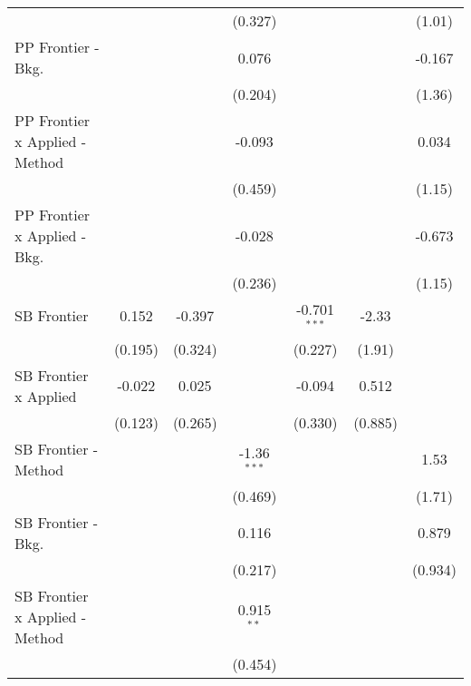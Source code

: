 \begin{tabular}{lcccccc}
                                  &               &         & (0.327)       &                &             & (1.01)\\   
   PP Frontier - Bkg.             &               &         & 0.076         &                &             & -0.167\\   
                                  &               &         & (0.204)       &                &             & (1.36)\\   
   PP Frontier x Applied - Method &               &         & -0.093        &                &             & 0.034\\   
                                  &               &         & (0.459)       &                &             & (1.15)\\   
   PP Frontier x Applied - Bkg.   &               &         & -0.028        &                &             & -0.673\\   
                                  &               &         & (0.236)       &                &             & (1.15)\\   
   SB Frontier                    & 0.152         & -0.397  &               & -0.701$^{***}$ & -2.33       &   \\   
                                  & (0.195)       & (0.324) &               & (0.227)        & (1.91)      &   \\   
   SB Frontier x Applied          & -0.022        & 0.025   &               & -0.094         & 0.512       &   \\   
                                  & (0.123)       & (0.265) &               & (0.330)        & (0.885)     &   \\   
   SB Frontier - Method           &               &         & -1.36$^{***}$ &                &             & 1.53\\   
                                  &               &         & (0.469)       &                &             & (1.71)\\   
   SB Frontier - Bkg.             &               &         & 0.116         &                &             & 0.879\\   
                                  &               &         & (0.217)       &                &             & (0.934)\\   
   SB Frontier x Applied - Method &               &         & 0.915$^{**}$  &                &             &   \\   
                                  &               &         & (0.454)       &                &             &   \\   

\end{tabular}
